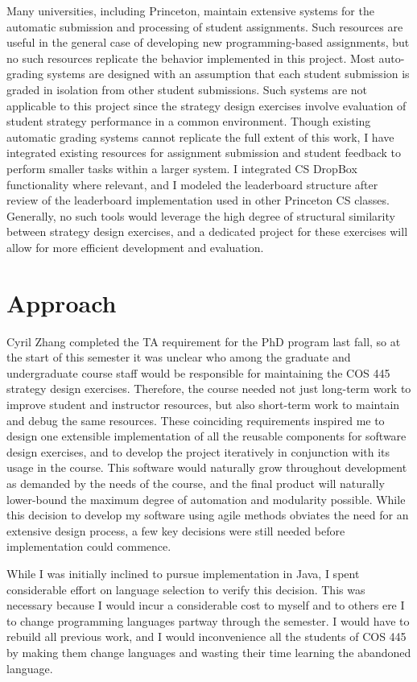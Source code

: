 \documentclass[pageno]{jpaper}
\begin{document}
Many universities, including Princeton, maintain extensive systems for the automatic submission and processing of student assignments.
Such resources are useful in the general case of developing new programming-based assignments, but no such resources replicate the behavior implemented in this project.
Most auto-grading systems are designed with an assumption that each student submission is graded in isolation from other student submissions.
Such systems are not applicable to this project since the strategy design exercises involve evaluation of student strategy performance in a common environment.
Though existing automatic grading systems cannot replicate the full extent of this work, I have integrated existing resources for assignment submission and student feedback to perform smaller tasks within a larger system.
I integrated CS DropBox~\cite{csdropbox} functionality where relevant, and I modeled the leaderboard structure after review of the leaderboard implementation used in other Princeton CS classes.
Generally, no such tools would leverage the high degree of structural similarity between strategy design exercises, and a dedicated project for these exercises will allow for more efficient development and evaluation.

\section*{Approach}
Cyril Zhang completed the TA requirement for the PhD program last fall, so at the start of this semester it was unclear who among the graduate and undergraduate course staff would be responsible for maintaining the COS 445 strategy design exercises.
Therefore, the course needed not just long-term work to improve student and instructor resources, but also short-term work to maintain and debug the same resources.
These coinciding requirements inspired me to design one extensible implementation of all the reusable components for software design exercises, and to develop the project iteratively in conjunction with its usage in the course.
This software would naturally grow throughout development as demanded by the needs of the course, and the final product will naturally lower-bound the maximum degree of automation and modularity possible.
While this decision to develop my software using agile methods obviates the need for an extensive design process, a few key decisions were still needed before implementation could commence.

While I was initially inclined to pursue implementation in Java, I spent considerable effort on language selection to verify this decision.
This was necessary because I would incur a considerable cost to myself and to others ere I to change programming languages partway through the semester.
I would have to rebuild all previous work, and I would inconvenience all the students of COS 445 by making them change languages and wasting their time learning the abandoned language.
\end{document}
